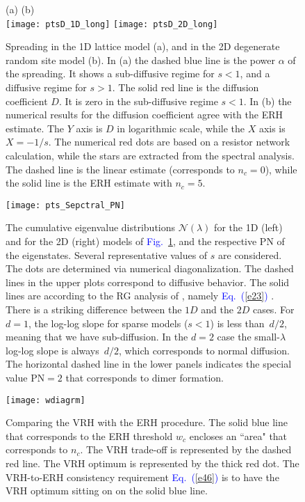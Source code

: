 \documentclass[onecolumn,fleqn,12pt,openany,draft]{book}
\newcommand{\Eq}[1]{\textcolor{blue}{Eq.\!\!~(\ref{#1})}}
\newcommand{\Fig}[1]{\textcolor{blue}{Fig.}\!\!~\ref{#1}}
\begin{document}
\begin{figure}[h!]
(a) \hspace{0.5\hsize} (b) \\
\texttt{[image: ptsD\_1D\_long]}
\texttt{[image: ptsD\_2D\_long]}

\caption{Spreading in the 1D lattice model (a), 
and in the 2D degenerate random site model (b). 
In (a) the dashed blue line is the power $\alpha$ of the spreading. 
It shows a sub-diffusive regime for $s<1$, and a diffusive regime for $s>1$. 
The solid red line is the diffusion coefficient $D$. 
It is zero in the sub-diffusive regime $s<1$. 
In (b) the numerical results for the diffusion coefficient agree 
with the ERH estimate. The $Y$ axis is $D$ in logarithmic scale, while the $X$ axis is $X=-1/s$. 
The numerical red dots are based on a resistor network calculation, 
while the stars are extracted from the spectral analysis.  
The dashed line is the linear estimate (corresponds to ${n_c = 0}$), 
while the solid line is the ERH estimate with ${n_c = 5}$.
}
\label{f1}
\end{figure}



\begin{figure}[H]
\texttt{[image: pts\_Sepctral\_PN]}

\caption{ 
The cumulative eigenvalue distributions $\mathcal{N}(\lambda)$ 
for the 1D (left) and for the 2D (right) models of \Fig{f1}, 
and the respective PN of the eigenstates.
Several representative values of $s$ are considered.
% 
The dots are determined via numerical diagonalization. 
The dashed lines in the upper plots correspond to diffusive behavior.  
The solid lines are according to the RG analysis of \cite{amir}, namely \Eq{e23} . 
%
There is a striking difference between the $1D$ and the $2D$ cases. 
For $d{=}1$, the log-log slope for sparse models ($s<1$) is less than~$d/2$, 
meaning that we have sub-diffusion. In the $d{=}2$ case the small-$\lambda$ log-log slope 
is always~$d/2$, which corresponds to normal diffusion.
%
The horizontal dashed line in the lower panels indicates 
the special value PN$=2$ that corresponds to dimer formation.
} 
\label{f2}
\end{figure}


\begin{figure}[H]
\texttt{[image: wdiagrm]}

\caption{Comparing the VRH with the ERH procedure. 
The solid blue line that corresponds to the ERH threshold $w_c$ 
encloses an ``area" that corresponds to $n_c$. 
The VRH trade-off is represented by the dashed red line. 
The VRH optimum is represented by the thick red dot.
The VRH-to-ERH consistency requirement \Eq{e46} 
is to have the VRH optimum sitting on on the solid blue line.}
\label{fv}
\end{figure}
\end{document}
